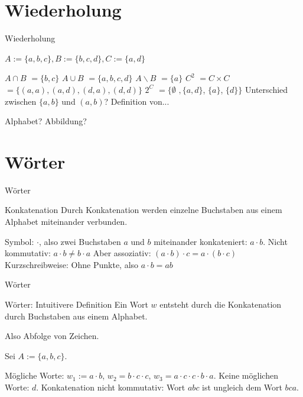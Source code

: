 

\section{Wiederholung}
\begin{frame}{Wiederholung}
	\pause
	
	$A := \{a, b, c\}, B := \{b, c, d\}, C := \{a, d\}$
	
	\begin{itemize}
		\pitem $A \cap B$ \pause $= \{b, c\}$
		\pitem $A \cup B$ \pause $= \{a, b, c, d\}$
		\pitem $A \backslash B$ \pause $= \{a\}$
		\pitem $C^2$ \pause $ = C \times C$ \pause $= \{(a, a), (a, d), (d, a), (d, d)\}$
		\pitem $2^C$ \pause $ = \{\emptyset$ \pause $, \{a, d\}$, \pause $\{a\}$, \pause $\{d\}\}$
		\pitem Unterschied zwischen $\{a, b\}$ und $(a, b)$?
		\pitem Definition von...
		\begin{itemize}
			\pitem Alphabet?
			\pitem Abbildung?
		\end{itemize}
	\end{itemize}
\end{frame}

\section{Wörter}

\begin{frame}{Wörter}
	\pause
	\begin{block}{Konkatenation}
		Durch Konkatenation werden einzelne Buchstaben aus einem Alphabet miteinander verbunden.
	\end{block}

	\begin{itemize}
		\pitem Symbol: $\cdot$\pause , also zwei Buchstaben $a$ und $b$ miteinander konkateniert: $a \cdot b$.
		\pitem Nicht kommutativ\pause : $a \cdot b \neq b \cdot a$
		\pitem Aber assoziativ\pause : $(a \cdot b) \cdot c = a \cdot (b \cdot c)$
		\pitem Kurzschreibweise\pause : Ohne Punkte\pause , also $a \cdot b = ab$
	\end{itemize}
\end{frame}

\begin{frame}{Wörter}
	\pause
	\begin{block}{Wörter: Intuitivere Definition}
		Ein Wort $w$ \pause entsteht durch die Konkatenation durch Buchstaben aus einem Alphabet.
	\end{block}

	\pause Also Abfolge von Zeichen.

	\pause Sei $A := \{a, b, c\}$.

	\begin{itemize}
		\pitem Mögliche Worte: \pause $w_1 := a \cdot b$\pause , $w_2 = b \cdot c \cdot c$\pause , $w_3 = a \cdot c \cdot c \cdot b \cdot a$.
		\pitem Keine möglichen Worte: \pause $d$.
		\pitem Konkatenation nicht kommutativ\pause : Wort $abc$ \pause ist ungleich dem Wort $bca$.
	\end{itemize}
\end{frame}

